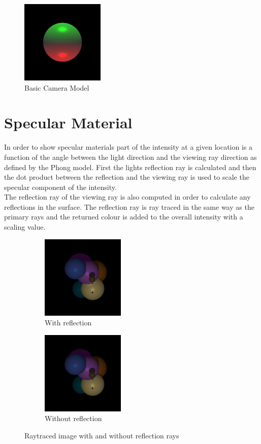 \documentclass{article}
\begin{document}
\begin{figure}[H]
  \begin{center}
  \includegraphics[width=150px]{Images/pointLight.png}
  \caption{Basic Camera Model}
  \label{fig:basiccammod}
  \end{center}
\end{figure}

\section{Specular Material}

In order to show specular materials part of the intensity at a given location is
a function of the angle between the light direction and the viewing ray direction
as defined by the Phong model. First the lights reflection ray is calculated and then
the dot product between the reflection and the viewing ray is used to scale the
specular component of the intensity.\\
The reflection ray of the viewing ray is also computed in order to calculate any
reflections in the surface. The reflection ray is ray traced in the same way as the
primary rays and the returned colour is added to the overall intensity with a
scaling value.

\begin{figure}[H]
\centering
\begin{subfigure}{.5\textwidth}
  \centering
  \includegraphics[width=150px]{Images/reflectionsOn.png}
  \caption{With reflection}
\end{subfigure}%
\begin{subfigure}{.5\textwidth}
  \centering
  \includegraphics[width=150px]{Images/reflectionsOff.png}
  \caption{Without reflection}
\end{subfigure}
\caption{Raytraced image with and without reflection rays}
\label{fig:reflectionrays}
\end{figure}
\end{document}
